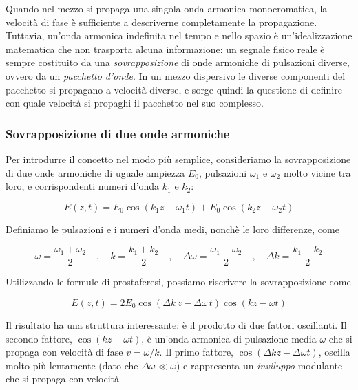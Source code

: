 Quando nel mezzo si propaga una singola onda armonica monocromatica, la velocità di fase è sufficiente a descriverne completamente la propagazione. Tuttavia, un'onda armonica indefinita nel tempo e nello spazio è un'idealizzazione matematica che non trasporta alcuna informazione: un segnale fisico reale è sempre costituito da una \emph{sovrapposizione} di onde armoniche di pulsazioni diverse, ovvero da un \emph{pacchetto d'onde}. In un mezzo dispersivo le diverse componenti del pacchetto si propagano a velocità diverse, e sorge quindi la questione di definire con quale velocità si propaghi il pacchetto nel suo complesso.\\

\subsubsection*{Sovrapposizione di due onde armoniche}

Per introdurre il concetto nel modo più semplice, consideriamo la sovrapposizione di due onde armoniche di uguale ampiezza $E_0$, pulsazioni $\omega_1$ e $\omega_2$ molto vicine tra loro, e corrispondenti numeri d'onda $k_1$ e $k_2$:

\begin{equation}
    E(z,t) = E_0 \cos(k_1 z - \omega_1 t) + E_0 \cos(k_2 z - \omega_2 t)
\end{equation}

\newpage

Definiamo le pulsazioni e i numeri d'onda medi, nonchè le loro differenze, come

\begin{equation}
    \omega = \frac{\omega_1 + \omega_2}{2} \quad, \quad k = \frac{k_1 + k_2}{2} \quad, \quad \Delta\omega = \frac{\omega_1 - \omega_2}{2} \quad, \quad \Delta k = \frac{k_1 - k_2}{2}
\end{equation}

Utilizzando le formule di prostaferesi, possiamo riscrivere la sovrapposizione come

\begin{tcolorbox}[colback=yellow!10!white, colframe=orange!70!black, boxrule=0.8pt]
\begin{equation}
    E(z,t) = 2 E_0 \cos(\Delta k \, z - \Delta\omega \, t) \cos(k z - \omega t)
\end{equation}
\end{tcolorbox}

Il risultato ha una struttura interessante: è il prodotto di due fattori oscillanti. Il secondo fattore, $\cos(kz - \omega t)$, è un'onda armonica di pulsazione media $\omega$ che si propaga con velocità di fase $v = \omega/k$. Il primo fattore, $\cos(\Delta k z - \Delta \omega t)$, oscilla molto più lentamente (dato che $\Delta \omega \ll \omega$) e rappresenta un \emph{inviluppo} modulante che si propaga con velocità 

